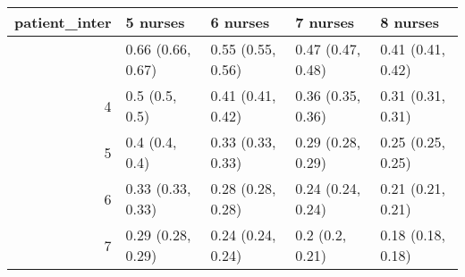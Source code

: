 \begin{table}[!t]


\fontsize{12.0pt}{14.4pt}\selectfont

\begin{tabular*}{\linewidth}{@{\extracolsep{\fill}}rllll}
\toprule
patient\_inter & 5 nurses & 6 nurses & 7 nurses & 8 nurses \\ 
\midrule\addlinespace[2.5pt]
3 & 0.66 (0.66, 0.67) & 0.55 (0.55, 0.56) & 0.47 (0.47, 0.48) & 0.41 (0.41, 0.42) \\
4 & 0.5 (0.5, 0.5) & 0.41 (0.41, 0.42) & 0.36 (0.35, 0.36) & 0.31 (0.31, 0.31) \\
5 & 0.4 (0.4, 0.4) & 0.33 (0.33, 0.33) & 0.29 (0.28, 0.29) & 0.25 (0.25, 0.25) \\
6 & 0.33 (0.33, 0.33) & 0.28 (0.28, 0.28) & 0.24 (0.24, 0.24) & 0.21 (0.21, 0.21) \\
7 & 0.29 (0.28, 0.29) & 0.24 (0.24, 0.24) & 0.2 (0.2, 0.21) & 0.18 (0.18, 0.18) \\
\bottomrule
\end{tabular*}

\end{table}
